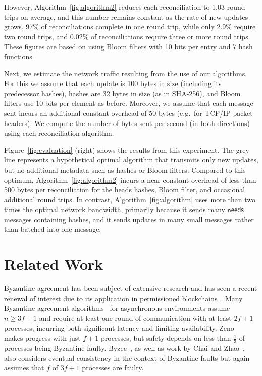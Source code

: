 \documentclass[a4paper,anonymous,USenglish]{lipics-v2019}
\begin{document}
However, Algorithm~\ref{fig:algorithm2} reduces each reconciliation to 1.03 round trips on average, and this number remains constant as the rate of new updates grows.
97\% of reconciliations complete in one round trip, while only 2.9\% require two round trips, and 0.02\% of reconciliations require three or more round trips.
These figures are based on using Bloom filters with 10 bits per entry and 7 hash functions.

Next, we estimate the network traffic resulting from the use of our algorithms.
For this we assume that each update is 100 bytes in size (including its predecessor hashes), hashes are 32 bytes in size (as in SHA-256), and Bloom filters use 10 bits per element as before.
Moreover, we assume that each message sent incurs an additional constant overhead of 50 bytes (e.g.\ for TCP/IP packet headers).
We compute the number of bytes sent per second (in both directions) using each reconciliation algorithm.

Figure~\ref{fig:evaluation} (right) shows the results from this experiment.
The grey line represents a hypothetical optimal algorithm that transmits only new updates, but no additional metadata such as hashes or Bloom filters.
Compared to this optimum, Algorithm~\ref{fig:algorithm2} incurs a near-constant overhead of less than 500 bytes per reconciliation for the heads hashes, Bloom filter, and occasional additional round trips.
In contrast, Algorithm~\ref{fig:algorithm} uses more than two times the optimal network bandwidth, primarily because it sends many $\mathsf{needs}$ messages containing hashes, and it sends updates in many small messages rather than batched into one message.

\section{Related Work}\label{sec:relwork}

Byzantine agreement has been subject of extensive research and has seen a recent renewal of interest due to its application in permissioned blockchains~\cite{Bano:2019}.
Many Byzantine agreement algorithms~\cite{Castro:1999,Kotla:2007,Bessani:2014,Aublin:2015,Cowling:2006,Abd:2005} for asynchronous environments assume $n \ge 3f+1$ and require at least one round of communication with at least $2f+1$ processes, incurring both significant latency and limiting availability.
Zeno~\cite{Singh:2009} makes progress with just $f+1$ processes, but safety depends on less than $\frac{1}{3}$ of processes being Byzantine-faulty.
Byzec~\cite{Shoker:2017}, as well as work by Chai and Zhao~\cite{Chai:2014}, also considers eventual consistency in the context of Byzantine faults but again assumes that $f$ of $3f+1$ processes are faulty.
\end{document}
